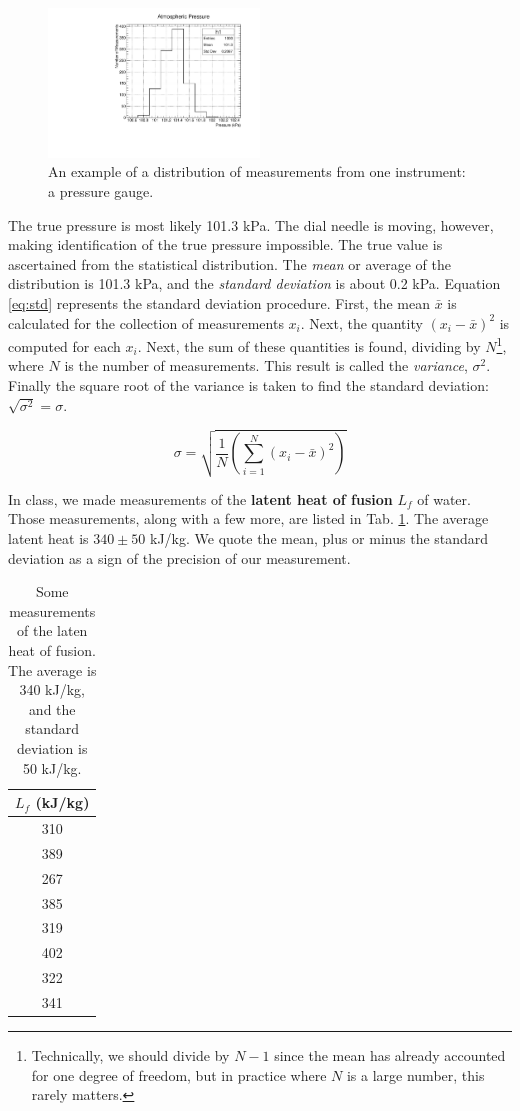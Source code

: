 \documentclass[12pt]{article}
\begin{document}
\begin{figure}
\centering
\includegraphics[width=0.5\textwidth]{histo.pdf}
\caption{\label{fig:histo} An example of a distribution of measurements from one instrument: a pressure gauge.}
\end{figure}

The true pressure is most likely 101.3 kPa.  The dial needle is moving, however, making identification of the true pressure impossible.  The true value is ascertained from the statistical distribution.  The \textit{mean} or average of the distribution is 101.3 kPa, and the \textit{standard deviation} is about 0.2 kPa.  Equation \ref{eq:std} represents the standard deviation procedure.  First, the mean $\bar{x}$ is calculated for the collection of measurements $x_i$.  Next, the quantity $(x_i - \bar{x})^2$ is computed for each $x_i$.  Next, the sum of these quantities is found, dividing by $N$\footnote{Technically, we should divide by $N-1$ since the mean has already accounted for one degree of freedom, but in practice where $N$ is a large number, this rarely matters.}, where $N$ is the number of measurements.  This result is called the \textit{variance}, $\sigma^2$.  Finally the square root of the variance is taken to find the standard deviation: $\sqrt{\sigma^2} = \sigma$.

\begin{equation}
\sigma = \sqrt{\frac{1}{N} \left( \sum_{i=1}^N (x_i - \bar{x})^2\right)} \label{eq:std}
\end{equation}

In class, we made measurements of the \textbf{latent heat of fusion} $L_f$ of water.  Those measurements, along with a few more, are listed in Tab. \ref{tab:heat}.  The average latent heat is $340\pm 50$ kJ/kg.  We quote the mean, plus or minus the standard deviation as a sign of the precision of our measurement. 

\begin{table}
\centering
\begin{tabular}{c}
$L_f$ (kJ/kg) \\ \hline
310 \\
389 \\
267 \\
385 \\
319 \\
402 \\
322 \\
341
\end{tabular}
\caption{\label{tab:heat} Some measurements of the laten heat of fusion.  The average is 340 kJ/kg, and the standard deviation is 50 kJ/kg.}
\end{table}
\end{document}
